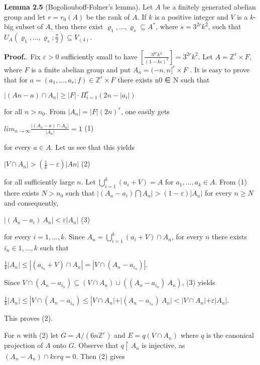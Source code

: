 \documentclass[12pt]{article}
\begin{document}
    \textbf{Lemma 2.5} (Bogoliouboff-Folner's lemma). Let $A$ be a finitely generated abelian group and let $r = r_0 (A)$ be the rank of $A$. If $k$ is
    a positive integer and $V$ is a $k$-big subset of $A$, then there exist $\varrho_1,...,\varrho_s \subseteq A^*$, where $s = 3^{2r} k^2$, such that $U_A (\varrho_1,...,\varrho_s; \frac{\pi}{2}) \subseteq V_{(4)}$.


    \textbf{Proof.}. Fix $\varepsilon > 0$ sufficiently small to have $[\frac{3^{2r} k^2}{(1-k \epsilon)^2}] = 3^{2r} k^2$. Let $A = \mathbb{Z}^r \times F$, where $F$ is a finite abelian group and put
    $A_n = (-n,n]^r \times F$ . It is easy to prove that for $a = (a_1,...,a_r; f ) \in \mathbb{Z}^r \times F$ there exists n0 ∈ N such that

    
        $|(An - a) \cap A_n| \geqslant  |F| · \Pi^r_{i=1} (2n - |a_i|)$ 


    for all $n > n_0$. From $|A_n|=|F|(2n)^r$, one easily gets


        $lim_{n \to \infty} \frac{|(A_n - a) \cap A_n|}{|A_n|} = 1 $  (1)


    for every $a ∈ A$. Let us see that this yields


        $|V \cap A_n| > (\frac{1}{k} - \varepsilon)|An|$  (2)


    for all sufficiently large $n$. Let $\bigcup^{k}_{i=1} (a_i + V) = A$ for $a_1,...,a_k \in A$. From (1) there exists $N > n_0$ such that
    $|(A_n - a_i) \bigcap A_n| > (1 - \varepsilon)|A_n|$ for every $n \geqslant N$ and consequently,


        $|(A_n - a_i) \ A_n| < \varepsilon|A_n|$  (3)


    for every $i = 1,...,k$. Since $A_n = \bigcup^k_{i=1}(a_i + V ) \cap A_n$, for every $n$ there exists $i_n \in {1,...,k}$ such that


        $\frac{1}{k}|A_n| \leqslant |(a_{i_n} + V ) \cap A_n| = |V \cap (A_n - a_{i_n})|$.


    Since $V \cap (A_n - a_{i_n} ) \subseteq (V \cap A_n) \cup ((A_n - a_{i_n} ) \ A_n)$, (3) yields


        $\frac{1}{k}|A_n| \leqslant | V \cap (A_n - a_{i_n} ) \leqslant |V \cap A_n| + |(A_n - a_{i_n} ) \ A_n | < |V \cap A_n| + \varepsilon|A_n|.$


    This proves (2).


        For $n$ with (2) let $G = A/(6n \mathbb{Z}^r)$ and $E = q(V \cap A_n)$ where $q$ is the canonical projection of $A$ onto $G$. Observe that $q  \upharpoonright {A_n}$
    is injective, as $(A_n - A_n) \cap ker q = {0}$. Then (2) gives
\end{document}
